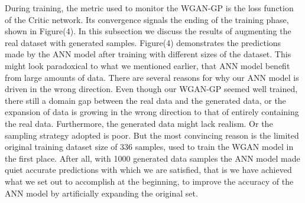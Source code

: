 \documentclass[draft, 10pt]{IEEEtran}
\begin{document}
During training, the metric used to monitor the WGAN-GP is the loss function of the Critic network. Its convergence signals the ending of the training phase, shown in Figure(4).
In this subsection we discuss the results of augmenting the real dataset with generated samples. Figure(4) demonstrates the predictions made by the ANN model after training with different sizes of the dataset.
This might look paradoxical to what we mentioned earlier, that ANN model benefit from large amounts of data. There are several reasons for why our ANN model is driven in the wrong direction. Even though our WGAN-GP seemed well trained, there still a domain gap between the real data and the generated data, or the expansion of data is growing in the wrong direction to that of entirely containing the real data. Furthermore, the generated data might lack realism. Or the sampling strategy adopted is poor. But the most convincing reason is the limited original training dataset size of 336 samples, used to train the WGAN model in the first place. After all, with 1000 generated data samples the ANN model made quiet accurate predictions with which we are satisfied, that is we have achieved what we set out to accomplish at the beginning, to improve the accuracy of the ANN model by artificially expanding the original set.
\end{document}
